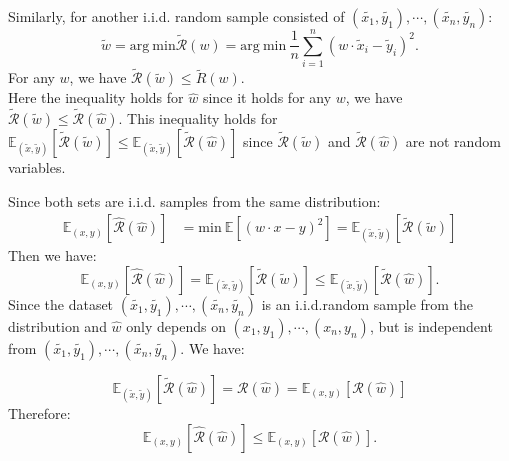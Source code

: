 \documentclass[twoside,11pt]{homework}
\begin{document}
\noindent Similarly, for another i.i.d. random sample consisted of $(\tilde{x_1}, \tilde{y_1}), \cdots, (\tilde{x_n}, \tilde{y_n})$:
\begin{equation*}
  \tilde{w} = \mathrm{arg\ min} \tilde{\mathcal{R}}(w) = \mathrm{arg\ min}\ \frac{1}{n} \sum_{i=1}^n (w \cdot \tilde{x}_i - \tilde{y}_i)^2.   
\end{equation*}
 For any $w$, we have $\tilde{\mathcal{R}}(\tilde{w}) \le \tilde{R}(w) $.%
 \\
Here the inequality holds for $\hat{w}$ since it holds for any $w$,  we have $\tilde{\mathcal{R}}(\tilde{w}) \le \tilde{\mathcal{R}}(\hat{w})$.
This inequality holds for $    \mathbb{E}_{(\tilde{x},\tilde{y})}[\tilde{\mathcal{R}}(\tilde{w})] 
    \le 
    \mathbb{E}_{(\tilde{x},\tilde{y})}[\tilde{\mathcal{R}}(\hat{w})]$ since $\tilde{\mathcal{R}}(\tilde{w})$ and $\tilde{\mathcal{R}}(\hat{w})$ are not random variables. 

\noindent Since both sets are i.i.d. samples from the same distribution:
\begin{equation*}
\begin{split}
   \mathbb{E}_{(x, y)}[\hat{\mathcal{R}}(\hat{w})] &= \mathrm{min} \ \mathbb{E} [(w \cdot x - y)^2]   = \mathbb{E}_{(\tilde{x},\tilde{y})}[\tilde{\mathcal{R}}(\tilde{w})] 
\end{split}
\end{equation*}Then we have:
\begin{equation*}
    \mathbb{E}_{(x, y)}[\hat{\mathcal{R}}(\hat{w})] = 
    \mathbb{E}_{(\tilde{x},\tilde{y})}[\tilde{\mathcal{R}}(\tilde{w})] 
    \le 
    \mathbb{E}_{(\tilde{x},\tilde{y})}[\tilde{\mathcal{R}}(\hat{w})].
\end{equation*}Since the dataset $(\tilde{x_1}, \tilde{y_1}), \cdots, (\tilde{x_n}, \tilde{y_n})$ is an i.i.d.random sample from the distribution and $\hat{w}$ only depends on $(x_1, y_1), \cdots, (x_n, y_n)$,  but is independent from $(\tilde{x_1}, \tilde{y_1}), \cdots, (\tilde{x_n}, \tilde{y_n})$. We have:

\begin{equation*}
    \mathbb{E}_{(\tilde{x},\tilde{y})}[\tilde{\mathcal{R}}(\hat{w})] = 
    \mathcal{R}(\hat{w}) = 
    \mathbb{E}_{(x,y)}[\mathcal{R}(\hat{w})] 
\end{equation*}
Therefore:
\begin{equation}
    \mathbb{E}_{(x,y)}[\hat{\mathcal{R}}(\hat{w})]  \le \mathbb{E}_{(x,y)}[\mathcal{R} (\hat{w})].
\end{equation}
\end{document}
